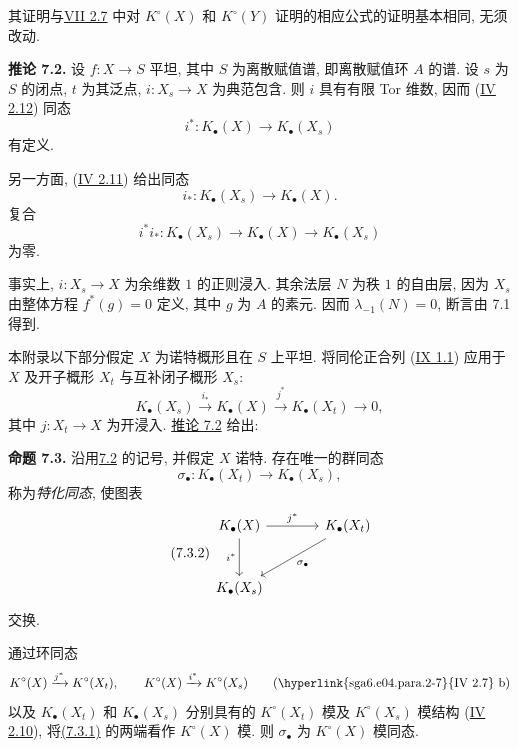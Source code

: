 其证明与\hyperlink{sga6.e07.para.2-6}{VII 2.7} 中对 $K^\circ(X)$ 和 $K^\circ(Y)$ 证明的相应公式的证明基本相同, 无须改动.
%
%

\textbf{推论 7.2.} 设 $f:X\to S$ 平坦, 其中 $S$ 为离散赋值谱, 即离散赋值环 $A$ 的谱. 设 $s$ 为 $S$ 的闭点, $t$ 为其泛点, $i:X_s\to X$ 为典范包含. 则 $i$ 具有有限 Tor 维数, 因而 (\hyperlink{sga6.e04.para.2-12}{IV 2.12}) 同态
%
%
%
%
\[
i^*:K_\bullet(X)\longrightarrow K_\bullet(X_s)
\]
有定义.

另一方面, (\hyperlink{sga6.e04.para.2-11}{IV 2.11}) 给出同态
\[
i_*:K_\bullet(X_s)\longrightarrow K_\bullet(X).
\]
复合
\[
i^*i_*:K_\bullet(X_s)\longrightarrow K_\bullet(X)
\longrightarrow K_\bullet(X_s)
\]
为零.

事实上, $i:X_s\to X$ 为余维数 $1$ 的正则浸入. 其余法层 $N$ 为秩 $1$ 的自由层, 因为 $X_s$ 由整体方程 $f^*(g)=0$ 定义, 其中 $g$ 为 $A$ 的素元. 因而 $\lambda_{-1}(N)=0$, 断言由 7.1 得到.
%
%
%

本附录以下部分假定 $X$ 为诺特概形且在 $S$ 上平坦. 将同伦正合列 (\hyperlink{sga6.e09.prop.1-1}{IX 1.1}) 应用于 $X$ 及开子概形 $X_t$ 与互补闭子概形 $X_s$:
%
%
\[
K_\bullet(X_s)\xrightarrow{i_*}K_\bullet(X)
\xrightarrow{j^*}K_\bullet(X_t)\longrightarrow0,
\]
其中 $j:X_t\to X$ 为开浸入. \hyperlink{sga6.e10.cor.7-2}{推论 7.2} 给出:

\textbf{命题 7.3.} 沿用\hyperlink{sga6.e10.cor.7-2}{7.2} 的记号, 并假定 $X$ 诺特. 存在唯一的群同态
%
%
\begin{equation}\tag{7.3.1}
\sigma_\bullet:K_\bullet(X_t)\longrightarrow K_\bullet(X_s),
\end{equation}
称为\emph{特化同态}, 使图表
\begin{equation}\tag{7.3.2}
\begin{tikzcd}[column sep=large,row sep=large]
K_\bullet(X) \arrow[r,"j^*"] \arrow[d,"i^*"'] &
K_\bullet(X_t) \arrow[dl,"\sigma_\bullet"]\\
K_\bullet(X_s) &
\end{tikzcd}
\end{equation}
交换.

通过环同态
%
\[
K^\circ(X)\xrightarrow{j^*}K^\circ(X_t),
\qquad
K^\circ(X)\xrightarrow{i^*}K^\circ(X_s)
\qquad\text{(\hyperlink{sga6.e04.para.2-7}{IV 2.7} b)}
\]
以及 $K_\bullet(X_t)$ 和 $K_\bullet(X_s)$ 分别具有的 $K^\circ(X_t)$ 模及 $K^\circ(X_s)$ 模结构 (\hyperlink{sga6.e04.para.2-10}{IV 2.10}), 将\hyperlink{sga6.e10.eq.7-3-1}{(7.3.1)} 的两端看作 $K^\circ(X)$ 模. 则 $\sigma_\bullet$ 为 $K^\circ(X)$ 模同态.
%
%

